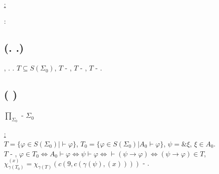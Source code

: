 \uline{\textcyr{\CYRD\cyro\cyrk\cyra\cyrz\cyra\cyrt\cyre\cyrl\cyrsftsn\cyrs\cyrt\cyrv\cyro}:}

\textcyr{\CYRO\cyrt} \textcyr{\cyrp\cyrr\cyro\cyrt\cyri\cyrv\cyrn\cyro\cyrg\cyro}: 

\subsection{\textcyr{\CYRT\cyre\cyro\cyrr\cyre\cyrm\cyra} (\textcyr{\cyrb}. \textcyr{\cyrd}.)}

\textcyr{\CYRL\cyryu\cyrb\cyra\cyrya} \textcyr{\cyrp\cyro\cyrl\cyrn\cyra\cyrya}
\textcyr{\cyrp\cyre\cyrr\cyre\cyrch\cyri\cyrs\cyrl\cyri\cyrm\cyra\cyrya}
\textcyr{\cyrt\cyre\cyro\cyrr\cyri\cyrya} \textcyr{\cyrya\cyrv\cyrl\cyrya\cyre\cyrt\cyrs\cyrya}
\textcyr{\cyrr\cyra\cyrz\cyrr\cyre\cyrsh\cyri\cyrm\cyro\cyrishrt},
\textcyr{\cyrt}. \textcyr{\cyre}. $T\subseteq S(\Sigma_{0})$, $T$
- \textcyr{\cyrp\cyre\cyrr\cyre\cyrch\cyri\cyrs\cyrl\cyri\cyrm\cyra},
$T$ - \textcyr{\cyrp\cyro\cyrl\cyrn\cyra\cyrya} \textcyr{\cyrt\cyre\cyro\cyrr\cyri\cyrya},
\textcyr{\cyrt\cyro\cyrg\cyrd\cyra} $T$ - \textcyr{\cyrn\cyre\cyrr\cyra\cyrz\cyrr\cyre\cyrsh\cyri\cyrm\cyra}.

\subsection{\textcyr{\CYRT\cyre\cyro\cyrr\cyre\cyrm\cyra} (\textcyr{\CYRCH\cyryo\cyrr\cyrch\cyra}
\textcyr{\cyro} \textcyr{\cyrn\cyre\cyrr\cyra\cyrz\cyrr\cyre\cyrsh\cyri\cyrm\cyro\cyrs\cyrt\cyri})}

\textcyr{\CYRM\cyrn\cyro\cyrzh\cyre\cyrs\cyrt\cyrv\cyro} $\prod_{\Sigma_{0}}$
- \textcyr{\cyrt\cyre\cyro\cyrr\cyre\cyrm} \textcyr{\cyrl\cyro\cyrg\cyri\cyrk\cyri}
\textcyr{\cyrp\cyrr\cyre\cyrd\cyri\cyrk\cyra\cyrt\cyro\cyrv} \textcyr{\cyrs\cyri\cyrg\cyrn\cyra\cyrt\cyru\cyrr\cyrery}
$\Sigma_{0}$ \textcyr{\cyrn\cyre\cyrr\cyra\cyrz\cyrr\cyre\cyrsh\cyri\cyrm\cyro}

\uline{\textcyr{\CYRD\cyro\cyrk\cyra\cyrz\cyra\cyrt\cyre\cyrl\cyrsftsn\cyrs\cyrt\cyrv\cyro}:}\\
\textcyr{\CYRP\cyru\cyrs\cyrt\cyrsftsn} $T=\{\varphi\in S(\Sigma_{0})|\vdash\varphi\}$,
$T_{0}=\{\varphi\in S(\Sigma_{0})|A_{0}\vdash\varphi\}$, $\psi=\&\xi$,
\textcyr{\cyrg\cyrd\cyre} $\xi\in A_{0}$.\\
\textcyr{\CYRE\cyrs\cyrl\cyri} $T$ - \textcyr{\cyrr\cyra\cyrz\cyrr\cyre\cyrsh\cyri\cyrm\cyro},
\textcyr{\cyrt\cyro} $\varphi\in T_{0}\Leftrightarrow A_{0}\vdash\varphi\Leftrightarrow\psi\vdash\varphi\Leftrightarrow\vdash(\psi\rightarrow\varphi)\Leftrightarrow(\psi\rightarrow\varphi)\in T$,\\
$\chi_{\gamma(T_{0})}^{(x)}=\chi_{\gamma(T)}(c(9,c(\gamma(\psi),(x))))$
- \textcyr{\cyru\cyrp\cyrr}. 

